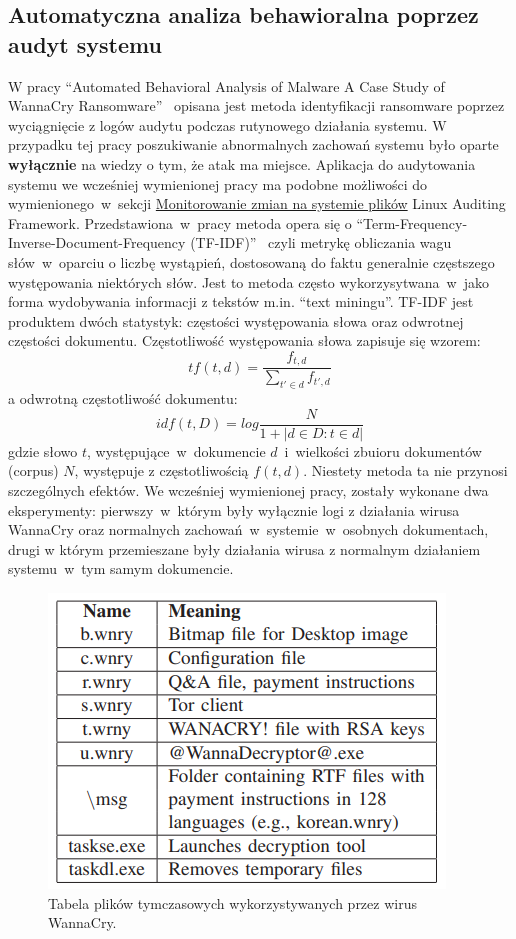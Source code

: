 \subsection{Automatyczna analiza behawioralna poprzez audyt systemu}
W pracy \foreignquote{english}{Automated Behavioral Analysis of Malware
A Case Study of WannaCry Ransomware}~\cite{8260673} opisana jest metoda identyfikacji ransomware
poprzez wyciągnięcie z logów audytu podczas rutynowego działania systemu. W przypadku tej pracy
poszukiwanie abnormalnych zachowań systemu było oparte \textbf{wyłącznie} na wiedzy o tym, że atak ma miejsce.
Aplikacja do audytowania systemu we wcześniej wymienionej pracy ma podobne możliwości do wymienionego~w~sekcji \hyperref[sec:monitorowanie]
{Monitorowanie zmian na systemie plików} Linux Auditing Framework.\newline
Przedstawiona~w~pracy metoda opera się o \foreignquote{english}{Term-Frequency-Inverse-Document-Frequency (TF-IDF)}~\cite{salton_term-weighting_1988} czyli metrykę obliczania 
wagu słów~w~oparciu o liczbę wystąpień, dostosowaną do faktu generalnie częstszego występowania niektórych słów.
Jest to metoda często wykorzysytwana~w~jako forma wydobywania informacji z tekstów m.in. \foreignquote{english}{text miningu}.
TF-IDF jest produktem dwóch statystyk: częstości występowania słowa oraz odwrotnej częstości dokumentu.
Częstotliwość występowania słowa zapisuje się wzorem:
$$
tf(t,d) = \frac{f_{t,d}}{\sum_{t'\in d}f_{t',d}}
$$
a odwrotną częstotliwość dokumentu:
$$
idf(t,D) = log \frac{N}{1 + |{d \in D : t \in d}|}
$$
gdzie słowo $t$, występujące~w~dokumencie $d$~i~wielkości zbuioru dokumentów (corpus) $N$, występuje z częstotliwością $f(t,d)$.
\newline
Niestety metoda ta nie przynosi szczególnych efektów. We wcześniej wymienionej pracy, zostały wykonane dwa eksperymenty: 
pierwszy~w~którym były wyłącznie logi z działania wirusa WannaCry oraz normalnych zachowań~w~systemie~w~osobnych dokumentach, drugi
w którym przemieszane były działania wirusa z normalnym działaniem systemu~w~tym samym dokumencie.
\begin{figure}[H]
    \centering
    \includegraphics[width=0.3\linewidth]{rysunki/wannashit.png}
    \caption{Tabela plików tymczasowych wykorzystywanych przez wirus WannaCry\protect\footnotemark.}
    \label{fig:enter-label}
\end{figure}

